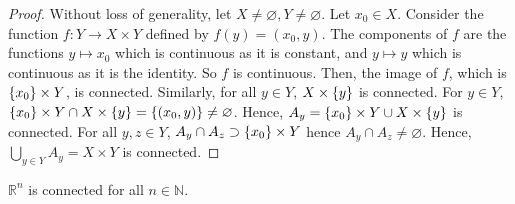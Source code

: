 \begin{proof}
	Without loss of generality, let \( X \neq \varnothing, Y \neq \varnothing \).
	Let \( x_0 \in X \).
	Consider the function \( f \colon Y \to X \times Y \) defined by \( f(y) = (x_0, y) \).
	The components of \( f \) are the functions \( y \mapsto x_0 \) which is continuous as it is constant, and \( y \mapsto y \) which is continuous as it is the identity.
	So \( f \) is continuous.
	Then, the image of \( f \), which is \( \qty{x_0} \times Y \), is connected.
	Similarly, for all \( y \in Y \), \( X \times \qty{y} \) is connected.
	For \( y \in Y \), \( \qty{x_0} \times Y \cap X \times \qty{y} = \qty{(x_0, y)} \neq \varnothing \).
	Hence, \( A_y = \qty{x_0} \times Y \cup X \times \qty{y} \) is connected.
	For all \( y,z \in Y \), \( A_y \cap A_z \supset \qty{x_0} \times Y \) hence \( A_y \cap A_z \neq \varnothing \).
	Hence, \( \bigcup_{y \in Y} A_y = X \times Y \) is connected.
\end{proof}
\begin{example}
	\( \mathbb R^n \) is connected for all \( n \in \mathbb N \).
\end{example}


